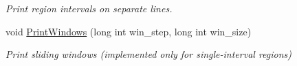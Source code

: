 \begin{DoxyCompactItemize}
\begin{DoxyCompactList}\small\item\em Print region intervals on separate lines. \end{DoxyCompactList}\item 
\hypertarget{classGenomicRegionGFF_a3815f1b27aef231a674c527e11f25880}{
void \hyperlink{classGenomicRegionGFF_a3815f1b27aef231a674c527e11f25880}{PrintWindows} (long int win\_\-step, long int win\_\-size)}
\label{classGenomicRegionGFF_a3815f1b27aef231a674c527e11f25880}

\begin{DoxyCompactList}\small\item\em Print sliding windows (implemented only for single-\/interval regions) \end{DoxyCompactList}\end{DoxyCompactItemize}
